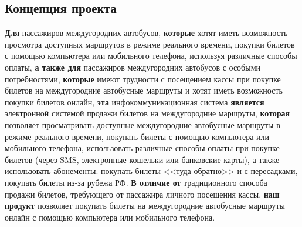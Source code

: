 \subsection{Концепция проекта}

\textbf{Для} пассажиров междугородних автобусов,
\textbf{которые} хотят иметь возможность
просмотра доступных маршрутов в режиме реального времени,
покупки билетов с помощью компьютера или мобильного телефона,
используя различные способы оплаты,
\textbf{а также для} пассажиров междугородних автобусов с особыми потребностями,
\textbf{которые} имеют трудности с посещением кассы
при покупке билетов на междугородние автобусные маршруты и хотят иметь
возможность покупки билетов онлайн,
\textbf{эта} инфокоммуникационная система
\textbf{является} электронной системой
продажи билетов на междугородние маршруты,
\textbf{которая} позволяет
просматривать доступные междугородние автобусные
маршруты в режиме реального времени,
покупать билеты с помощью компьютера или мобильного телефона,
использовать различные способы оплаты при покупке билетов (через SMS,
электронные кошельки или банковские карты), а также использовать абонементы.
покупать билеты <<туда-обратно>> и с пересадками,
покупать билеты из-за рубежа РФ.
\textbf{В отличие от} традиционного способа продажи билетов, требующего
от пассажира личного посещения кассы,
\textbf{наш продукт} позволяет покупать билеты на междугородние автобусные
маршруты онлайн с помощью компьютера или мобильного телефона.
